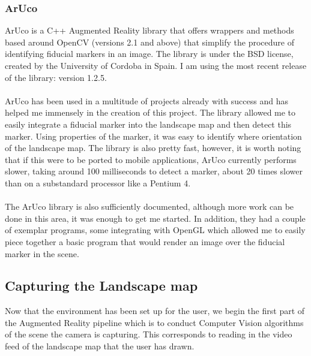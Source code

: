\documentclass[11pt]{article}
\begin{document}
\subsubsection{ArUco}
ArUco is a C++ Augmented Reality library that offers wrappers and methods
based around OpenCV (versions 2.1 and above) that simplify the procedure
of identifying fiducial markers in an image. The library is under the BSD
license, created by the University of Cordoba in Spain. I am using the
most recent release of the library: version 1.2.5.\\
\\
ArUco has been used in a multitude of projects already with success and 
has helped me immensely in the creation of this project. The library 
allowed me to easily integrate a fiducial marker into the landscape map
and then detect this marker. Using properties of the marker, it was easy
to identify where orientation of the landscape map. The library is also 
pretty fast, however, it is worth noting that if this were to be ported
to mobile applications, ArUco currently performs slower, taking
around 100 milliseconds to detect a marker, about 20 times slower than
on a substandard processor like a Pentium 4.\\
\\
The ArUco library is also sufficiently documented, although more work can
be done in this area, it was enough to get me started. In addition, they
had a couple of exemplar programs, some integrating with OpenGL which 
allowed me to easily piece together a basic program that would render
an image over the fiducial marker in the scene.

\subsection{Capturing the Landscape map}
Now that the environment has been set up for the user, we begin the first
part of the Augmented Reality pipeline which is to conduct Computer
Vision algorithms of the scene the camera is capturing. This corresponds to
reading in the video feed of the landscape map that the user has drawn.
\end{document}
